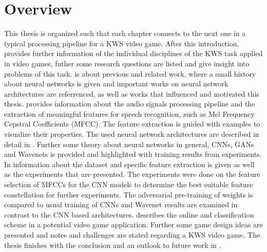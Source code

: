 
\section{Overview}\label{sec:intro_overview}
\thesisStateRevised
This thesis is organized such that each chapter connects to the next one in a typical processing pipeline for a KWS video game.
After this introduction,  provides further information of the individual disciplines of the KWS task applied in video games, futher some research questions are listed and give insight into problems of this task.
 is about previous and related work, where a small history about neural networks is given and important works on neural network architectures are referrenced, as well as works that influenced and motivated this thesis.
 provides information about the audio signals processing pipeline and the extraction of meaningful features for speech recognition, such as Mel Frequency Cepstral Coefficients (MFCC).
The feature extraction is guided with examples to visualize their properties.
The used neural network architectures are described in detail in . 
Further some theory about neural networks in general, CNNs, GANs and Wavenets is provided and highlighted with training results from experiments.
In  information about the dataset and specific feature extraction is given as well as the experiments that are presented.
The experiments were done on the feature selection of MFCCs for the CNN models to determine the best suitable feature constellation for further experiments.
The adversarial pre-training of weights is compared to usual training of CNNs and Wavenet results are examined in contrast to the CNN based architectures.
 describes the online and classification scheme in a potential video game application.
Further some game design ideas are presented and notes and challenges are stated regarding a KWS video game.
The thesis finishes with the conclusion and an outlook to future work in .


